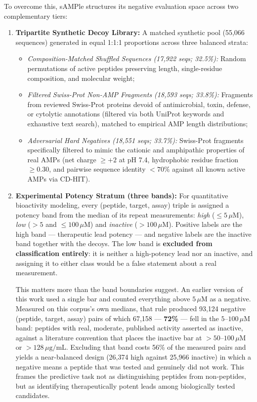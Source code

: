 \documentclass[unnumsec,webpdf,contemporary,large]{oup-authoring-template}%
\begin{document}
To overcome this, sAMPle structures its negative evaluation space across two complementary tiers:
\begin{enumerate}
    \item \textbf{Tripartite Synthetic Decoy Library:} A matched synthetic pool (55,066 sequences) generated in equal 1:1:1 proportions across three balanced strata:
    \begin{itemize}
        \item \emph{Composition-Matched Shuffled Sequences (17,922 seqs; 32.5\%):} Random permutations of active peptides preserving length, single-residue composition, and molecular weight;
        \item \emph{Filtered Swiss-Prot Non-AMP Fragments (18,593 seqs; 33.8\%):} Fragments from reviewed Swiss-Prot proteins devoid of antimicrobial, toxin, defense, or cytolytic annotations (filtered via both UniProt keywords and exhaustive text search), matched to empirical AMP length distributions;
        \item \emph{Adversarial Hard Negatives (18,551 seqs; 33.7\%):} Swiss-Prot fragments specifically filtered to mimic the cationic and amphipathic properties of real AMPs (net charge $\ge +2$ at pH 7.4, hydrophobic residue fraction $\ge 0.30$, and pairwise sequence identity $<70\%$ against all known active AMPs via CD-HIT).
    \end{itemize}
    \item \textbf{Experimental Potency Stratum (three bands):} For quantitative bioactivity modeling, every (peptide, target, assay) triple is assigned a potency band from the median of its repeat measurements: \emph{high} ($\le 5\,\mu\text{M}$), \emph{low} ($>5$ and $\le 100\,\mu\text{M}$) and \emph{inactive} ($>100\,\mu\text{M}$). Positive labels are the high band --- therapeutic lead potency --- and negative labels are the inactive band together with the decoys. The low band is \textbf{excluded from classification entirely}: it is neither a high-potency lead nor an inactive, and assigning it to either class would be a false statement about a real measurement.

    This matters more than the band boundaries suggest. An earlier version of this work used a single bar and counted everything above $5\,\mu\text{M}$ as a negative. Measured on this corpus's own medians, that rule produced 93,124 negative (peptide, target, assay) pairs of which 67,158 --- \textbf{72\%} --- fell in the $5$--$100\,\mu\text{M}$ band: peptides with real, moderate, published activity asserted as inactive, against a literature convention that places the inactive bar at $>50$--$100\,\mu\text{M}$ or $>128\,\mu\text{g/mL}$. Excluding that band costs 56\% of the measured pairs and yields a near-balanced design (26,374 high against 25,966 inactive) in which a negative means a peptide that was tested and genuinely did not work. This frames the predictive task not as distinguishing peptides from non-peptides, but as identifying therapeutically potent leads among biologically tested candidates.
\end{enumerate}
\end{document}
